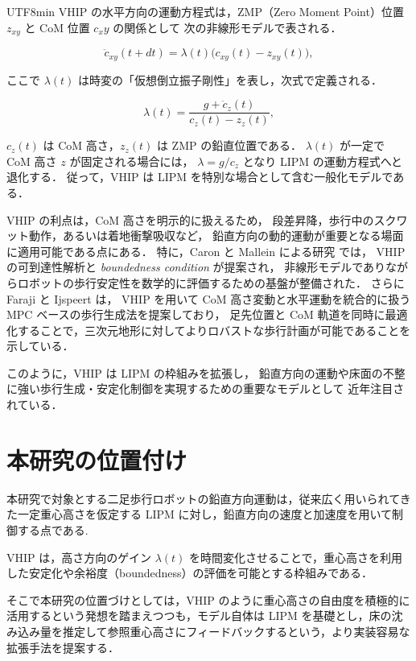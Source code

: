 \documentclass[a4paper,11pt]{report}
\begin{document}
\begin{CJK}{UTF8}{min}
VHIP の水平方向の運動方程式は，ZMP（Zero Moment Point）位置 $z_{xy}$ と CoM 位置 $c_xy$ の関係として
次の非線形モデルで表される．

\begin{equation}
  \ddot{c}_{xy}(t + dt) = \lambda(t)\bigl(c_{xy}(t) - z_{xy}(t)\bigr),
  \label{eq:vhip_basic}
\end{equation}

ここで $\lambda(t)$ は時変の「仮想倒立振子剛性」を表し，次式で定義される．

\begin{equation}
  \lambda(t) = \frac{g + \ddot{c}_z(t)}{c_{z}(t) - z_{z}(t)},
\end{equation}

$c_z(t)$ は CoM 高さ，$z_z(t)$ は ZMP の鉛直位置である．
$\lambda(t)$ が一定で CoM 高さ $z$ が固定される場合には，
$\lambda = g/c_z$ となり LIPM の運動方程式へと退化する．
従って，VHIP は LIPM を特別な場合として含む一般化モデルである．

VHIP の利点は，CoM 高さを明示的に扱えるため，
段差昇降，歩行中のスクワット動作，あるいは着地衝撃吸収など，
鉛直方向の動的運動が重要となる場面に適用可能である点にある．
特に，Caron と Mallein による研究 \cite{caron2017} では，
VHIP の可到達性解析と \emph{boundedness condition} が提案され，
非線形モデルでありながらロボットの歩行安定性を数学的に評価するための基盤が整備された．
さらに Faraji と Ijspeert \cite{faraji2017} は，
VHIP を用いて CoM 高さ変動と水平運動を統合的に扱う MPC ベースの歩行生成法を提案しており，
足先位置と CoM 軌道を同時に最適化することで，三次元地形に対してよりロバストな歩行計画が可能であることを示している．

このように，VHIP は LIPM の枠組みを拡張し，
鉛直方向の運動や床面の不整に強い歩行生成・安定化制御を実現するための重要なモデルとして
近年注目されている．

\section{本研究の位置付け}
本研究で対象とする二足歩行ロボットの鉛直方向運動は，従来広く用いられてきた一定重心高さを仮定する LIPM に対し，鉛直方向の速度と加速度を用いて制御する点である.

VHIP は，高さ方向のゲイン $\lambda(t)$ を時間変化させることで，重心高さを利用した安定化や余裕度（boundedness）の評価を可能とする枠組みである．

そこで本研究の位置づけとしては，VHIP のように重心高さの自由度を積極的に活用するという発想を踏まえつつも，モデル自体は LIPM を基礎とし，床の沈み込み量を推定して参照重心高さにフィードバックするという，より実装容易な拡張手法を提案する．


\end{CJK}
\end{document}
